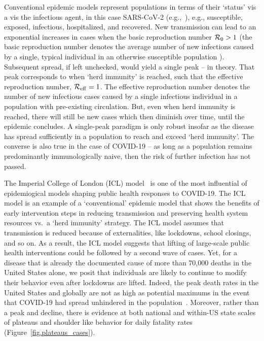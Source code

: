 Conventional epidemic
models represent populations in terms of their `status' vis
a vis the infectious agent, in this case 
SARS-CoV-2 (e.g.,~\citep{ferguson2020report,kucharski2020early,kissler_medrxiv2020,park_medrxiv2020,kraemer_2020sci,li_science2020,wu2020estimating}), e.g.,
susceptible, exposed, infectious,
hospitalized, and recovered.  
New transmission can lead to an exponential increases in cases 
when the basic reproduction number ${\cal{R}}_0>1$ (the
basic reproduction number denotes the average number of new
infections caused by a single, typical individual in an otherwise
susceptible population \citep{anderson1991infectious}).  Subsequent
spread, if left unchecked, would yield a single peak -- in theory. That 
peak corresponds to when `herd immunity' is reached, such
that the effective reproduction number, ${\cal{R}}_{\mathrm{eff}}=1$.
The effective reproduction number denotes the number of new
infectious cases caused by a single infectious individual
in a population with pre-existing circulation.
But, even when herd immunity is reached, there will still be new cases 
which then diminish over time, until the epidemic concludes.  
A single-peak paradigm is
only robust insofar as the disease has spread
sufficiently in a population to reach and exceed `herd immunity'.
The converse
is also true in the case of COVID-19 -- as long as 
a population remains predominantly immunologically
naive, then the risk of further infection has not passed. 

The Imperial College of London (ICL) model~\citep{ferguson2020report} is
one of the most influential of 
epidemiogical models shaping public health responses to COVID-19. The ICL model is an
example of a `conventional' epidemic model
that shows the benefits of  early intervention steps in reducing
transmission and preserving health system resources vs.~a `herd immunity' strategy.  
The ICL model assumes that
transmission is reduced because of externalities, like lockdowns,
school closings, and so on.  
As a result, the ICL model suggests that lifting of large-scale
public health interventions could be followed by a second wave of cases.
Yet, for a disease
that is already the documented cause of more than 70,000 deaths
in the United States alone, we posit that individuals
are likely to continue to modify
their behavior even after lockdowns are lifted.  
Indeed, the peak death rates in the United States and globally
are not as high as potential maximums in the event that
COVID-19 had spread unhindered in the population~\citep{ferguson2020report}. 
Moreover, rather than a peak and decline, there is evidence at both national
and within-US state scales of plateaus and shoulder like
behavior for daily fatality rates (Figure~\ref{fig.plateaus_cases}).   

